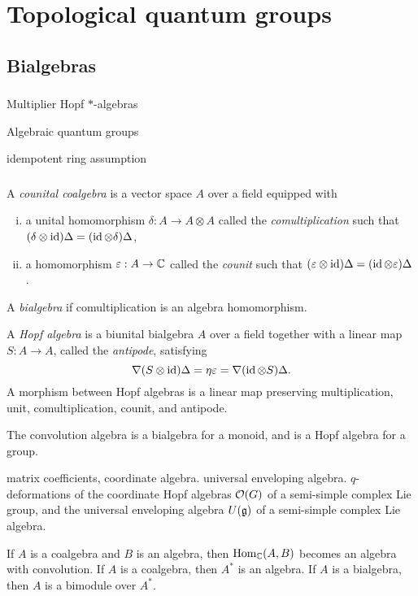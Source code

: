 \documentclass{../../large}
\begin{document}
\part{Topological quantum groups}


\chapter{Bialgebras}
\section{}
Multiplier Hopf $*$-algebras

Algebraic quantum groups


idempotent ring assumption

\section{}
\begin{prb}
A \emph{counital coalgebra} is a vector space $A$ over a field equipped with
\begin{enumerate}[(i)]
\item a unital homomorphism $\delta:A\to A\otimes A$ called the \emph{comultiplication} such that $(\delta\otimes\operatorname{id})\Delta=(\operatorname{id}\otimes\delta)\Delta$,
\item a homomorphism $\varepsilon:A\to\mathbb{C}$ called the \emph{counit} such that $(\varepsilon\otimes\operatorname{id})\Delta=(\operatorname{id}\otimes\varepsilon)\Delta$.
\end{enumerate}

A \emph{bialgebra} if comultiplication is an algebra homomorphism.


A \emph{Hopf algebra} is a biunital bialgebra $A$ over a field together with a linear map $S:A\to A$, called the \emph{antipode}, satisfying
\[\nabla(S\otimes\operatorname{id})\Delta=\eta\varepsilon=\nabla(\operatorname{id}\otimes S)\Delta.\]
A morphism between Hopf algebras is a linear map preserving multiplication, unit, comultiplication, counit, and antipode.

The convolution algebra is a bialgebra for a monoid, and is a Hopf algebra for a group.
\end{prb}

matrix coefficients, coordinate algebra.
universal enveloping algebra.
$q$-deformations of the coordinate Hopf algebras $\mathcal{O}(G)$ of a semi-simple complex Lie group, and the universal enveloping algebra $U(\mathfrak{g})$ of a semi-simple complex Lie algebra.

If $A$ is a coalgebra and $B$ is an algebra, then $\operatorname{Hom}_{\mathbb{C}}(A,B)$ becomes an algebra with convolution.
If $A$ is a coalgebra, then $A^*$ is an algebra.
If $A$ is a bialgebra, then $A$ is a bimodule over $A^*$.
\end{document}
